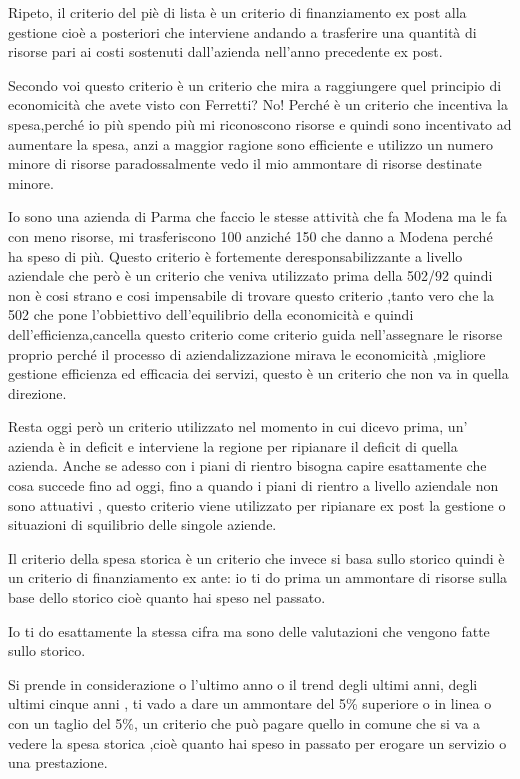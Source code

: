 \documentclass[]{article}
\begin{document}
Ripeto, il criterio del piè di lista è un criterio di finanziamento ex
post alla gestione cioè a posteriori che interviene andando a trasferire
una quantità di risorse pari ai costi sostenuti dall'azienda nell'anno
precedente ex post.

Secondo voi questo criterio è un criterio che mira a raggiungere quel
principio di economicità che avete visto con Ferretti? No! Perché è un
criterio che incentiva la spesa,perché io più spendo più mi riconoscono
risorse e quindi sono incentivato ad aumentare la spesa, anzi a maggior
ragione sono efficiente e utilizzo un numero minore di risorse
paradossalmente vedo il mio ammontare di risorse destinate minore.

Io sono una azienda di Parma che faccio le stesse attività che fa Modena
ma le fa con meno risorse, mi trasferiscono 100 anziché 150 che danno a
Modena perché ha speso di più. Questo criterio è fortemente
deresponsabilizzante a livello aziendale che però è un criterio che
veniva utilizzato prima della 502/92 quindi non è cosi strano e cosi
impensabile di trovare questo criterio ,tanto vero che la 502 che pone
l'obbiettivo dell'equilibrio della economicità e quindi
dell'efficienza,cancella questo criterio come criterio guida
nell'assegnare le risorse proprio perché il processo di
aziendalizzazione mirava le economicità ,migliore gestione efficienza ed
efficacia dei servizi, questo è un criterio che non va in quella
direzione.

Resta oggi però un criterio utilizzato nel momento in cui dicevo prima,
un' azienda è in deficit e interviene la regione per ripianare il
deficit di quella azienda. Anche se adesso con i piani di rientro
bisogna capire esattamente che cosa succede fino ad oggi, fino a quando
i piani di rientro a livello aziendale non sono attuativi , questo
criterio viene utilizzato per ripianare ex post la gestione o situazioni
di squilibrio delle singole aziende.

Il criterio della spesa storica è un criterio che invece si basa sullo
storico quindi è un criterio di finanziamento ex ante: io ti do prima un
ammontare di risorse sulla base dello storico cioè quanto hai speso nel
passato.

Io ti do esattamente la stessa cifra ma sono delle valutazioni che
vengono fatte sullo storico.

Si prende in considerazione o l'ultimo anno o il trend degli ultimi
anni, degli ultimi cinque anni , ti vado a dare un ammontare del 5\%
superiore o in linea o con un taglio del 5\%, un criterio che può pagare
quello in comune che si va a vedere la spesa storica ,cioè quanto hai
speso in passato per erogare un servizio o una prestazione.
\end{document}
